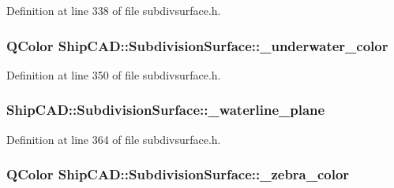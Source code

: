 Definition at line 338 of file subdivsurface.\-h.

\hypertarget{classShipCAD_1_1SubdivisionSurface_a8a64eabb53fa0facaa6e59579305328b}{
\subsubsection[{\-\_\-underwater\-\_\-color}]{\setlength{\rightskip}{0pt plus 5cm}Q\-Color Ship\-C\-A\-D\-::\-Subdivision\-Surface\-::\-\_\-underwater\-\_\-color\hspace{0.3cm}{\ttfamily [protected]}}}\label{classShipCAD_1_1SubdivisionSurface_a8a64eabb53fa0facaa6e59579305328b}


Definition at line 350 of file subdivsurface.\-h.

\hypertarget{classShipCAD_1_1SubdivisionSurface_a762de21a330588c7bfbe081637cab2f3}{
\subsubsection[{\-\_\-waterline\-\_\-plane}]{ Ship\-C\-A\-D\-::\-Subdivision\-Surface\-::\-\_\-waterline\-\_\-plane\hspace{0.3cm}{\ttfamily [protected]}}}\label{classShipCAD_1_1SubdivisionSurface_a762de21a330588c7bfbe081637cab2f3}


Definition at line 364 of file subdivsurface.\-h.

\hypertarget{classShipCAD_1_1SubdivisionSurface_a047d5d0575c944d216ada589e30ee3bd}{
\subsubsection[{\-\_\-zebra\-\_\-color}]{\setlength{\rightskip}{0pt plus 5cm}Q\-Color Ship\-C\-A\-D\-::\-Subdivision\-Surface\-::\-\_\-zebra\-\_\-color\hspace{0.3cm}{\ttfamily [protected]}}}\label{classShipCAD_1_1SubdivisionSurface_a047d5d0575c944d216ada589e30ee3bd}


